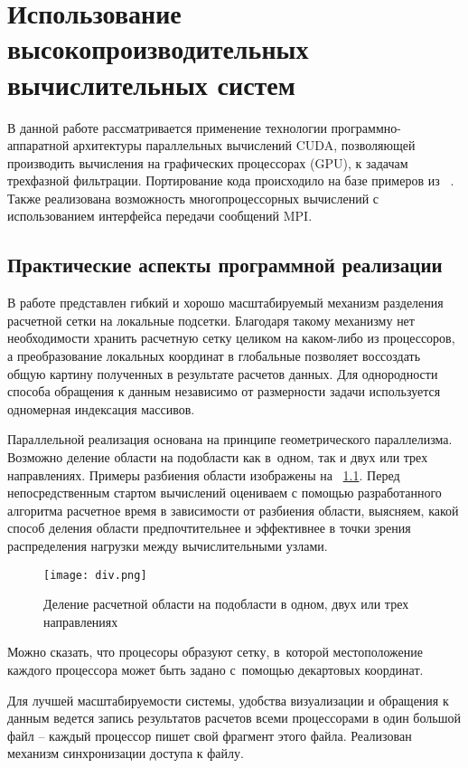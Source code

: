 \chapter{Использование высокопроизводительных вычислительных систем} \label{ch:ch4}

В данной работе рассматривается применение технологии программно-аппаратной архитектуры параллельных вычислений CUDA, позволяющей производить вычисления на графических процессорах (GPU), к задачам трехфазной фильтрации.
Портирование кода происходило на базе примеров из ~\cite{Sanders-CUDA}.
Также реализована возможность многопроцессорных вычислений с использованием
интерфейса передачи сообщений MPI.

\section{Практические аспекты программной реализации} \label{ch:ch4/sect1}

В работе представлен гибкий и хорошо масштабируемый механизм разделения
расчетной сетки на локальные подсетки. Благодаря такому механизму
нет необходимости хранить расчетную сетку целиком на каком-либо из
процессоров, а преобразование локальных координат в глобальные
позволяет воссоздать общую картину полученных в результате расчетов
данных. Для однородности способа обращения к данным независимо
от размерности задачи используется одномерная индексация массивов.

Параллельной реализация основана на принципе геометрического параллелизма.
Возможно деление области на подобласти как в~одном, так и двух или трех направлениях.
Примеры разбиения области изображены на ~\ref{pic_div}.
Перед непосредственным стартом вычислений оцениваем с помощью разработанного алгоритма расчетное время в зависимости от разбиения
области, выясняем, какой способ деления области предпочтительнее и эффективнее в точки зрения распределения нагрузки между вычислительными узлами.

\begin{figure}[!h]\center
\texttt{[image: div.png]} 
\caption{Деление расчетной области на подобласти в одном, двух или трех направлениях}
\label{pic_div}
\end{figure}

Можно сказать, что процесоры образуют сетку, в~которой местоположение каждого процессора может быть задано с~помощью декартовых координат.

Для лучшей масштабируемости системы, удобства визуализации и обращения
к данным ведется запись результатов расчетов всеми процессорами в один большой файл -- каждый процессор
пишет свой фрагмент этого файла. Реализован механизм синхронизации доступа к файлу.


